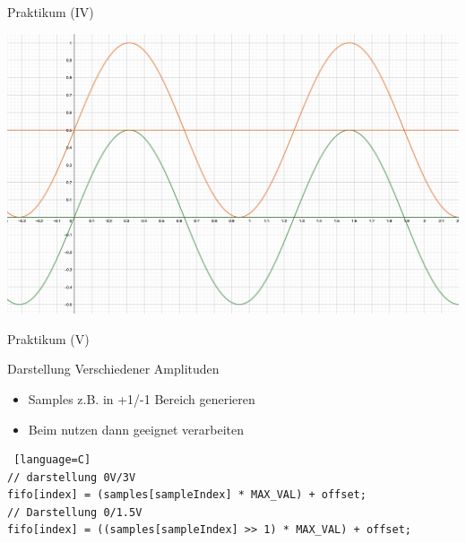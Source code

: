   \begin{frame} {Praktikum (IV)}
    \begin{center}
      \includegraphics[height = .8\textheight]{figs/sinus.png}
    \end{center}
  \end{frame}



  \begin{frame} [fragile] {Praktikum (V)}
    \begin{block} {Darstellung Verschiedener Amplituden}  
      \begin{itemize}
          \item Samples z.B. in +1/-1 Bereich generieren
          \item Beim nutzen dann geeignet verarbeiten
      \end{itemize}
    \end{block}
    \begin{lstlisting} [language=C]
// darstellung 0V/3V
fifo[index] = (samples[sampleIndex] * MAX_VAL) + offset;
// Darstellung 0/1.5V
fifo[index] = ((samples[sampleIndex] >> 1) * MAX_VAL) + offset;
    \end{lstlisting}
  \end{frame}

